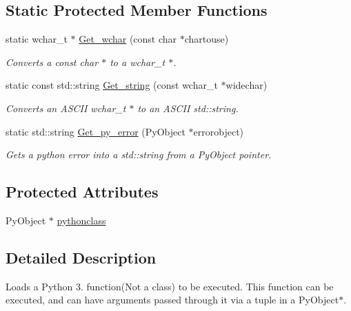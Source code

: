 \subsection*{Static Protected Member Functions}
\begin{DoxyCompactItemize}
\item 
static wchar\+\_\+t $\ast$ \hyperlink{classjetfuel_1_1inspire_1_1Python__module__loader_ad4fb50f7f68749decfeef1204fe06acb}{Get\+\_\+wchar} (const char $\ast$chartouse)
\begin{DoxyCompactList}\small\item\em Converts a const char $\ast$ to a wchar\+\_\+t $\ast$. \end{DoxyCompactList}\item 
static const std\+::string \hyperlink{classjetfuel_1_1inspire_1_1Python__module__loader_a88da3316adbe919080ad1c92045b4ad3}{Get\+\_\+string} (const wchar\+\_\+t $\ast$widechar)
\begin{DoxyCompactList}\small\item\em Converts an A\+S\+C\+II wchar\+\_\+t $\ast$ to an A\+S\+C\+II std\+::string. \end{DoxyCompactList}\item 
static std\+::string \hyperlink{classjetfuel_1_1inspire_1_1Python__module__loader_adb872547c2aec3b27e5845fedb7a3f42}{Get\+\_\+py\+\_\+error} (Py\+Object $\ast$errorobject)
\begin{DoxyCompactList}\small\item\em Gets a python error into a std\+::string from a Py\+Object pointer. \end{DoxyCompactList}\end{DoxyCompactItemize}
\subsection*{Protected Attributes}
\begin{DoxyCompactItemize}
\item 
Py\+Object $\ast$ \hyperlink{classjetfuel_1_1inspire_1_1Python__module__loader_a973a8f86d446820b38b18f87fe51465a}{pythonclass}
\end{DoxyCompactItemize}


\subsection{Detailed Description}
Loads a Python 3. function(\+Not a class) to be executed. This function can be executed, and can have arguments passed through it via a tuple in a Py\+Object$\ast$.

